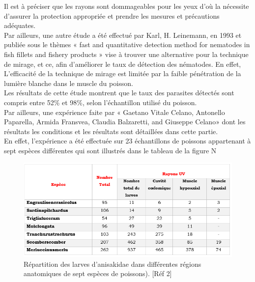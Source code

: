 \documentclass[12pt,a4paper]{article}
\begin{document}
Il est à préciser que les rayons sont dommageables pour les yeux d’où la nécessite d’assurer la protection appropriée et prendre les mesures et précautions adéquates. \\
Par ailleurs, une autre étude a été effectué par Karl, H. Leinemann, en 1993 et publiée sous le thèmes «  fast and quantitative detection method for nematodes in fish fillets and fishery products » vise à trouver une alternative pour la technique de mirage, et ce, afin d’améliorer le taux de détection des nématodes. En effet, L'efficacité de la technique de mirage est limitée par la faible pénétration de la lumière blanche dans le muscle du poisson. \\
Les résultats de cette étude montrent que le taux des parasites détectés sont compris entre 52\% et 98\%, selon l’échantillon utilisé du poisson. \\
Par ailleurs, une expérience faite par « Gaetano Vitale Celano, Antonello Paparella, Armida Fransvea, Claudia Balzaretti, and Giuseppe Celano» dont les résultats les conditions et les résultats sont détaillées dans cette partie.\\
En effet, l’expérience a été effectuée sur 23 échantillons de poissons appartenant à sept espèces différentes qui sont illustrés dans le tableau de la figure N \\
\begin{figure}[!h]
   \center
   \includegraphics[scale=0.5]{Tableau01.png}
   \caption {Répartition des larves d'anisakidae dans différentes régions anatomiques de sept espèces de poissons). [Réf 2]}
\end{figure}
\end{document}
